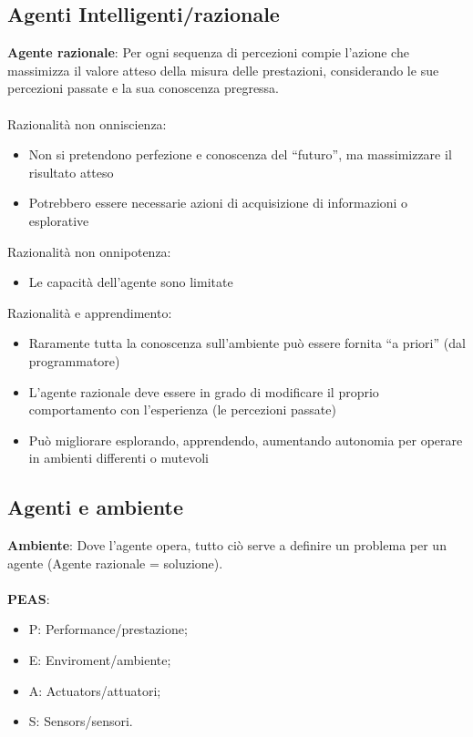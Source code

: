 \documentclass[../main.tex]{subfiles}
\begin{document}
	\subsection{Agenti Intelligenti/razionale}
	\textbf{Agente razionale}: Per ogni sequenza di percezioni compie l’azione che massimizza il valore atteso della misura delle prestazioni, considerando le sue percezioni passate e la sua conoscenza pregressa.\\ \\
	Razionalità non onniscienza:
	\begin{itemize}
		\item Non si pretendono perfezione e conoscenza del “futuro”, ma massimizzare il risultato atteso
		\item Potrebbero essere necessarie azioni di acquisizione di informazioni o esplorative
	\end{itemize}
	Razionalità non onnipotenza:
	\begin{itemize}
		\item Le capacità dell’agente sono limitate
	\end{itemize}
	Razionalità e apprendimento:
	\begin{itemize}
		\item Raramente tutta la conoscenza sull’ambiente può essere fornita “a priori” (dal programmatore)
		\item L’agente razionale deve essere in grado di modificare il proprio comportamento con l’esperienza (le percezioni passate)
		\item Può migliorare esplorando, apprendendo, aumentando autonomia per operare in ambienti differenti o mutevoli
	\end{itemize}
	\subsection{Agenti e ambiente}
	\textbf{Ambiente}: Dove l’agente opera, tutto ciò serve a definire un problema per un agente (Agente razionale = soluzione).\\ \\
	\textbf{PEAS}:
	\begin{itemize}
		\item P: Performance/prestazione;
		\item E: Enviroment/ambiente;
		\item A: Actuators/attuatori;
		\item S: Sensors/sensori.
	\end{itemize}
\end{document}
